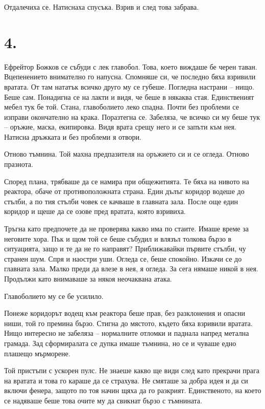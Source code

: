 \documentclass[ebook,openany,12pt]{memoir}
\begin{document}
Отдалечиха се. Натиснаха спусъка. Взрив и след това забрава.

\section*{4.}

Ефрейтор Божков се събуди с лек главобол. Това, което виждаше бе черен таван. Вцепенението внимателно го напусна. Спомняше си, че последно бяха взривили вратата. От там нататък всичко друго му се губеше. Погледна настрани – нищо. Беше сам. Понадигна се на лакти и видя, че беше в някаква стая. Единственият мебел тук бе той. Стана, главоболието леко спадна. Почти без проблеми се изправи окончателно на крака. Поразтегна се. Забеляза, че всичко си му беше тук – оръжие, маска, екипировка. Видя врата срещу него и се запъти към нея. Натисна дръжката и без проблеми я отвори.

Отново тъмнина. Той махна предпазителя на оръжието си и се огледа. Отново празнота.

Според плана, трябваше да се намира при общежитията. Те бяха на нивото на реактора, обаче от противоположната страна. Един дълъг коридор водеше до стълби, а по тия стълби човек се качваше в главната зала. После още един коридор и щеше да се озове пред вратата, която взривиха.

Тръгна като предпочете да не проверява какво има по стаите. Имаше време за неговите хора. Пък и щом той се беше събудил и влязъл толкова бързо в ситуацията, защо и те да не го направят? Приближавайки първите стълби, чу странен шум. Спря и наостри уши. Огледа се, беше спокойно. Изкачи се до главната зала. Малко преди да влезе в нея, я огледа. За сега нямаше никой в нея. Продължи като внимаваше за някоя неочаквана атака.

Главоболието му се бе усилило.

Понеже коридорът водещ към реактора беше прав, без разклонения и опасни ниши, той го премина бързо. Стигна до мястото, където бяха взривили вратата. Нищо интересно не забеляза – нормалните отломки и паднала напред метална грамада. Зад сформиралата се дупка имаше тъмнина, но се и чуваше едно плашещо мърморене.

Той пристъпи с ускорен пулс. Не знаеше какво ще види след като прекрачи прага на вратата и това го караше да се страхува. Не смяташе за добра идея и да си включи фенера, защото по тоя начин щяха да го разкрият. Единственото, на което се надяваше беше това очите му да свикнат бързо с тъмнината. 
\end{document}
